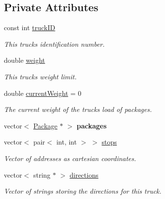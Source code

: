 \subsection*{Private Attributes}
\begin{DoxyCompactItemize}
\item 
const int \hyperlink{classTruck_a7552538334822cb0526b3b714fcc09fc}{truck\+ID}\hypertarget{classTruck_a7552538334822cb0526b3b714fcc09fc}{}\label{classTruck_a7552538334822cb0526b3b714fcc09fc}

\begin{DoxyCompactList}\small\item\em This truck\textquotesingle{}s identification number. \end{DoxyCompactList}\item 
double \hyperlink{classTruck_a51f90c7e56b08f4ad92436233326f746}{weight}\hypertarget{classTruck_a51f90c7e56b08f4ad92436233326f746}{}\label{classTruck_a51f90c7e56b08f4ad92436233326f746}

\begin{DoxyCompactList}\small\item\em This truck\textquotesingle{}s weight limit. \end{DoxyCompactList}\item 
double \hyperlink{classTruck_af1817d5b13eecfd5f3a6037eb76de31f}{current\+Weight} = 0\hypertarget{classTruck_af1817d5b13eecfd5f3a6037eb76de31f}{}\label{classTruck_af1817d5b13eecfd5f3a6037eb76de31f}

\begin{DoxyCompactList}\small\item\em The current weight of the truck\textquotesingle{}s load of packages. \end{DoxyCompactList}\item 
vector$<$ \hyperlink{classPackage}{Package} $\ast$ $>$ {\bfseries packages}\hypertarget{classTruck_a56932c0950c2a2a129e557f003980ffc}{}\label{classTruck_a56932c0950c2a2a129e557f003980ffc}

\item 
vector$<$ pair$<$ int, int $>$ $>$ \hyperlink{classTruck_a72e3a307480578a189c8446f16556be8}{stops}\hypertarget{classTruck_a72e3a307480578a189c8446f16556be8}{}\label{classTruck_a72e3a307480578a189c8446f16556be8}

\begin{DoxyCompactList}\small\item\em Vector of addresses as cartesian coordinates. \end{DoxyCompactList}\item 
vector$<$ string $\ast$ $>$ \hyperlink{classTruck_a62316796e456b748a80c870e41e058f4}{directions}\hypertarget{classTruck_a62316796e456b748a80c870e41e058f4}{}\label{classTruck_a62316796e456b748a80c870e41e058f4}

\begin{DoxyCompactList}\small\item\em Vector of strings storing the directions for this truck. \end{DoxyCompactList}\end{DoxyCompactItemize}


